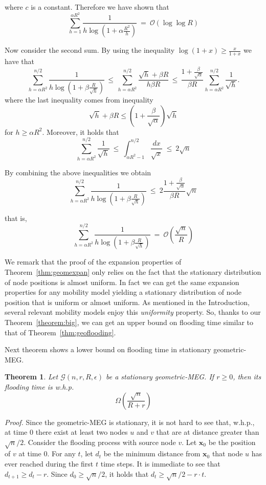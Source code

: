 \documentclass[10pt,a4paper]{article}
\newtheorem{theorem}[definition]{Theorem}
\newcommand{\proof}{\noindent\textit{Proof. }}
\newcommand{\qed}{\hspace{\stretch{1}$\square$}}
\begin{document}
\noindent where $c$ is a constant. Therefore we have shown that
$$
\sum_{h = 1}^{\alpha R^2} \frac{1}{h\log(1 + \alpha\frac{R^2}{h})}  \  = \  \mathcal{O}(\log\log R)
$$

\noindent Now consider the second sum. By using the inequality $\log(1 + x) \geqslant \frac{x}{1 + x}$ we have
that
$$ \sum_{h = \alpha R^2}^{n/2} \frac{1}{h\log(1 + \beta\frac{R}{\sqrt{h}})}
\,\leqslant\, \sum_{h = \alpha R^2}^{n/2} \frac{\sqrt{h} + \beta R}{h\beta R}
\,\leqslant\, \frac{1 + \frac{\beta}{\sqrt{\alpha}}}{\beta R}\sum_{h = \alpha R^2}^{n/2} \frac{1}{\sqrt{h}}.
$$
\noindent where the last inequality comes from inequality
$$
\sqrt{h} + \beta R \leqslant (1 + \frac{\beta}{\sqrt{\alpha}}) \sqrt{h}
$$
for $h \geqslant \alpha R^2$. Moreover, it holds that
$$
\sum_{h = \alpha R^2}^{n/2} \frac{1}{\sqrt{h}} \ \leqslant\  \int_{\alpha R^2 - 1}^{n/2}
\frac{dx}{\sqrt{x}} \ \leqslant \  2\sqrt{n}
$$


\noindent By combining the above inequalities we obtain
$$
\sum_{h = \alpha R^2}^{n/2} \frac{1}{h\log(1 + \beta\frac{R}{\sqrt{h}})} \ \leqslant\  2\frac{1 +
\frac{\beta}{\sqrt{\alpha}}}{\beta R}\sqrt{n}
$$

\noindent that is,
$$
\sum_{h = \alpha R^2}^{n/2} \frac{1}{h\log(1 + \beta\frac{R}{\sqrt{h}})} \ = \ \mathcal{O}\left(\frac{\sqrt{n}}{R} \right)
$$
\qed




\noindent We remark that the proof of the expansion properties of Theorem~\ref{thm:geomexpan} only relies on the fact that the stationary distribution of node positions is almost uniform. In fact we can get the same expansion properties for any mobility model yielding a stationary distribution of node position that is uniform or almost uniform. As mentioned in the Introduction, several relevant mobility models enjoy this \emph{uniformity} property. So, thanks to our Theorem~\ref{theorem:big}, we can get an upper bound on flooding time similar to that of Theorem~\ref{thm:geoflooding}.

\noindent Next theorem shows a lower bound on flooding time in stationary geometric-MEG.

\begin{theorem}\label{thm:geolb}
Let $\mathcal{G}(n, r, R, \epsilon)$ be a stationary geometric-MEG. If $r\geqslant 0$, then its 
flooding time is w.h.p.
$$
\Omega\left(\frac{\sqrt{n}}{R + r}\right)
$$
\end{theorem}
\proof Since the geometric-MEG is stationary, it is not hard to see that, w.h.p., at time 0 there exist at least two nodes $u$ and $v$ that are at distance greater than $\sqrt{n}/2$. Consider the flooding process with source node $v$. Let $\mathbf{x}_0$ be the position of $v$ at time 0. For any $t$, let $d_t$ be the minimum distance from $\mathbf{x}_0$ that node $u$ has ever reached during the first $t$ time steps. It is immediate to see that $d_{t+1} \geqslant d_t - r$. Since $d_0 \geqslant \sqrt{n}/2$, it holds that $d_t \geqslant \sqrt{n}/2 - r\cdot t$.
\end{document}
